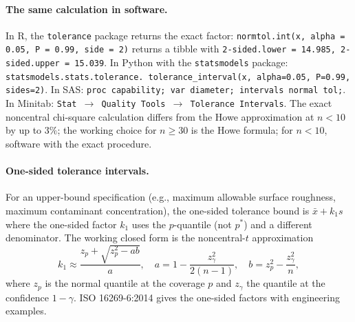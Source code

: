 \paragraph{The same calculation in software.} In R, the
\texttt{tolerance} package \cite{web:ch08t3p-r-tolerance} returns
the exact factor: \texttt{normtol.int(x, alpha = 0.05, P = 0.99,
side = 2)} returns a tibble with \texttt{2-sided.lower = 14.985,
2-sided.upper = 15.039}. In Python with the
\texttt{statsmodels} package: \texttt{statsmodels.stats.tolerance.
tolerance\_interval(x, alpha=0.05, P=0.99, sides=2)}. In SAS:
\texttt{proc capability; var diameter; intervals normal tol;}.
In Minitab: \texttt{Stat $\to$ Quality Tools $\to$ Tolerance
Intervals}. The exact noncentral chi-square calculation differs
from the Howe approximation at $n < 10$ by up to $3\%$; the
working choice for $n \geq 30$ is the Howe formula; for $n < 10$,
software with the exact procedure.

\paragraph{One-sided tolerance intervals.} For an upper-bound
specification (e.g., maximum allowable surface roughness, maximum
contaminant concentration), the one-sided tolerance bound is
$\bar{x} + k_{1} s$ where the one-sided factor $k_{1}$ uses the
$p$-quantile (not $p^{*}$) and a different denominator. The
working closed form is the noncentral-$t$ approximation
\[
k_{1} \approx \frac{z_{p} + \sqrt{z_{p}^{2} - a b}}{a},
\quad
a = 1 - \frac{z_{\gamma}^{2}}{2(n - 1)},
\quad
b = z_{p}^{2} - \frac{z_{\gamma}^{2}}{n},
\]
where $z_{p}$ is the normal quantile at the coverage $p$ and
$z_{\gamma}$ the quantile at the confidence $1 - \gamma$. ISO
16269-6:2014 \cite{std:ch08t3p-iso-16269-6} gives the
one-sided factors with engineering examples.


